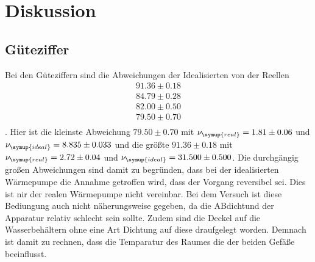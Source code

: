 \section{Diskussion}
\label{sec:Diskussion}

\subsection{Güteziffer}
Bei den Güteziffern sind die Abweichungen der Idealisierten von der Reellen 
\begin{gather*}
    91.36    \pm   0.18\\
    84.79    \pm   0.28\\
    82.00    \pm   0.50\\
    79.50    \pm   0.70\\
\end{gather*}
.
Hier ist die kleinste Abweichung $79.50    \pm   0.70$ mit $\nu_{\symup{real}}=1.81\pm   0.06 $   und     $\nu_{\symup{ideal}}=8.835    \pm   0.033$
und die größte $91.36    \pm   0.18$ mit $\nu_{\symup{real}}=2.72   \pm   0.04  $ und $   \nu_{\symup{ideal}}=31.500    \pm  0.500 $. 
Die durchgängig großen Abweichungen sind damit zu begründen, dass bei der idealisierten Wärmepumpe die Annahme getroffen wird, dass der Vorgang reversibel sei.
Dies ist nir der realen Wärmepumpe nicht vereinbar.
Bei dem Versuch ist diese Bediungung auch nicht näherungsweise gegeben, da die ABdichtund der Apparatur relativ schlecht sein sollte.
Zudem sind die Deckel auf die Wasserbehältern ohne eine Art Dichtung auf diese draufgelegt worden. 
Demnach ist damit zu rechnen, dass die Temparatur des Raumes die der beiden Gefäße beeinflusst.

